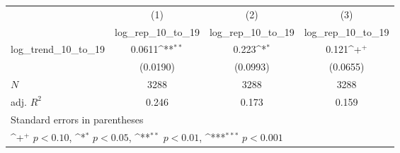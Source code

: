 {
\def\sym#1{\ifmmode^{#1}\else\(^{#1}\)\fi}
\begin{tabular}{l*{3}{c}}
\hline\hline
            &\multicolumn{1}{c}{(1)}&\multicolumn{1}{c}{(2)}&\multicolumn{1}{c}{(3)}\\
            &\multicolumn{1}{c}{log\_rep\_10\_to\_19}&\multicolumn{1}{c}{log\_rep\_10\_to\_19}&\multicolumn{1}{c}{log\_rep\_10\_to\_19}\\
\hline
log\_trend\_10\_to\_19&      0.0611\sym{**} &       0.223\sym{*}  &       0.121\sym{+}  \\
            &    (0.0190)         &    (0.0993)         &    (0.0655)         \\
\hline
\(N\)       &        3288         &        3288         &        3288         \\
adj. \(R^{2}\)&       0.246         &       0.173         &       0.159         \\
\hline\hline
\multicolumn{4}{l}{\footnotesize Standard errors in parentheses}\\
\multicolumn{4}{l}{\footnotesize \sym{+} \(p<0.10\), \sym{*} \(p<0.05\), \sym{**} \(p<0.01\), \sym{***} \(p<0.001\)}\\
\end{tabular}
}
